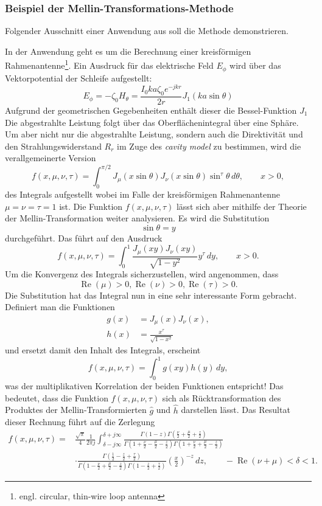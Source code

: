 \subsubsection{Beispiel der Mellin-Transformations-Methode}
Folgender Ausschnitt einer Anwendung aus \cite{mellin:mellin-transform-method} 
soll die Methode demonstrieren.

In der Anwendung geht es um die Berechnung einer 
kreisförmigen Rahmenantenne\footnote{engl. circular, thin-wire loop antenna}.
Ein Ausdruck für das elektrische Feld $E_\phi $ wird über das Vektorpotential 
der Schleife aufgestellt:
\[
    E_\phi 
    = -\zeta_0 H_\theta  
    = \frac{I_0ka\zeta_0e^{-jkr}}{2r} J_1(ka \sin\theta)
\]
Aufgrund der geometrischen Gegebenheiten enthält dieser die Bessel-Funktion $J_1$
Die abgestrahlte Leistung folgt über das Oberflächenintegral über eine Sphäre.
Um aber nicht nur die abgestrahlte Leistung, sondern auch die Direktivität und 
den Strahlungswiderstand $R_r$ im Zuge des {\em cavity model} zu bestimmen, 
wird die verallgemeinerte Version 
\[
    f(x, \mu, \nu, \tau)
    = \int_{0}^{\pi/2} J_\mu(x \sin\theta) J_\nu(x \sin\theta) 
    \sin^\tau \theta \,d\theta, \qquad x > 0 
    ,
\]
des Integrals aufgestellt wobei im Falle der kreisförmigen Rahmenantenne 
$\mu = \nu = \tau = 1$ ist.
Die Funktion $f(x, \mu, \nu, \tau)$ lässt sich aber mithilfe der Theorie 
der Mellin-Transformation weiter analysieren.
Es wird die Substitution
\[
    \sin\theta = y
\]
durchgeführt.
Das führt auf den Ausdruck
\[
    f(x, \mu, \nu, \tau)
    = \int_{0}^{1} \frac{J_\mu(xy) J_\nu(xy)}{\sqrt{1-y^2}} y^\tau \,dy, 
    \qquad x > 0 
    .
\]
Um die Konvergenz des Integrals sicherzustellen, wird angenommen, dass
\[
    \operatorname{Re}(\mu) > 0,
    \operatorname{Re}(\nu) > 0,
    \operatorname{Re}(\tau) > 0.
\]
Die Substitution hat das Integral nun in eine sehr interessante Form gebracht.
Definiert man die Funktionen 
\begin{align*}
    g(x) &= J_\mu(x)J_\nu(x), \\
    h(x) &= \frac{x^\tau}{\sqrt{1-x^2}} 
\end{align*}
und ersetzt damit den Inhalt des Integrals, erscheint
\[
    f(x, \mu, \nu, \tau)
    = \int_{0}^{1} g(xy) h(y) \,dy, 
\]
was der multiplikativen Korrelation der beiden Funktionen entspricht!
Das bedeutet, dass die Funktion $f(x, \mu, \nu, \tau)$ sich als 
Rücktransformation des Produktes der Mellin-Transformierten $\hat{g}$ 
und $\hat{h}$ darstellen lässt.
Das Resultat dieser Rechnung führt auf die Zerlegung 
\begin{align*}
    f(x, \mu, \nu, \tau)
    = &\frac{\sqrt{\pi}}{4} \frac{1}{2\pi j} 
    \int_{\delta -j\infty}^{\delta +j\infty} 
    \frac{\Gamma(1 - z)\Gamma(\frac{\nu}{2}+\frac{\mu}{2}+\frac{z}{2})}{\Gamma(1+\frac{\nu}{2}-\frac{\mu}{2}-\frac{z}{2}) \Gamma(1+\frac{\nu}{2}+\frac{\mu}{2}-\frac{z}{2})} \\
    &\cdot \frac{\Gamma(\frac{1}{2}-\frac{z}{2}+\frac{\tau}{2})}{\Gamma(1-\frac{\nu}{2}+\frac{\mu}{2}-\frac{z}{2})\Gamma(1-\frac{z}{2}+\frac{\tau}{2})} 
    \left(\frac{x}{2}\right)^{-z} \,dz,
    \qquad -\operatorname{Re}(\nu + \mu) < \delta < 1
    .
\end{align*}
